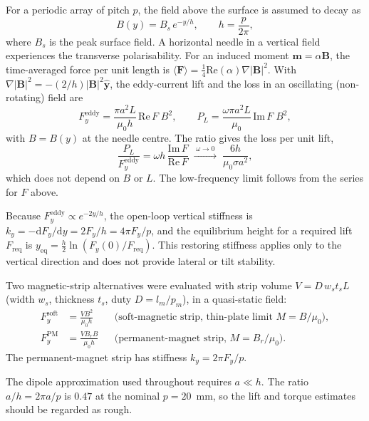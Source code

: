 \documentclass[12pt, a4paper]{article}
\begin{document}
For a periodic array of pitch $p$, the field above the surface is assumed to decay as
\begin{equation}
B(y)=B_s\,e^{-y/h},
\qquad
h=\frac{p}{2\pi},
\end{equation}
where $B_s$ is the peak surface field. A horizontal needle in a vertical field experiences the transverse polarisability. For an induced moment $\mathbf{m}=\alpha\mathbf{B}$, the time-averaged force per unit length is $\langle\mathbf{F}\rangle=\tfrac14\mathrm{Re}(\alpha)\nabla|\mathbf{B}|^{2}$. With $\nabla|\mathbf{B}|^{2}=-(2/h)|\mathbf{B}|^{2}\hat{\mathbf{y}}$, the eddy-current lift and the loss in an oscillating (non-rotating) field are
\begin{equation}
F_y^{\text{eddy}}
=
\frac{\pi a^{2}L}{\mu_0h}\,\mathrm{Re}\,F\;B^{2},
\qquad
P_L
=
\frac{\omega\pi a^{2}L}{\mu_0}\,\mathrm{Im}\,F\;B^{2},
\end{equation}
with $B=B(y)$ at the needle centre. The ratio gives the loss per unit lift,
\begin{equation}
\frac{P_L}{F_y^{\text{eddy}}}
=
\omega h\,\frac{\mathrm{Im}\,F}{\mathrm{Re}\,F}
\;\xrightarrow{\;\omega\to0\;}\;
\frac{6h}{\mu_0\sigma a^{2}},
\end{equation}
which does not depend on $B$ or $L$. The low-frequency limit follows from the series for $F$ above.

Because $F_y^{\text{eddy}}\propto e^{-2y/h}$, the open-loop vertical stiffness is $k_y=-\mathrm{d}F_y/\mathrm{d}y=2F_y/h=4\pi F_y/p$, and the equilibrium height for a required lift $F_{\text{req}}$ is $y_{\text{eq}}=\tfrac{h}{2}\ln\!\left(F_y(0)/F_{\text{req}}\right)$. This restoring stiffness applies only to the vertical direction and does not provide lateral or tilt stability.

Two magnetic-strip alternatives were evaluated with strip volume $V=D\,w_st_sL$ (width $w_s$, thickness $t_s$, duty $D=l_m/p_m$), in a quasi-static field:
\begin{align}
F_y^{\text{soft}}&=\frac{V B^{2}}{\mu_0h}
&&\text{(soft-magnetic strip, thin-plate limit } M=B/\mu_0\text{)},\\
F_y^{\text{PM}}&=\frac{V B_r B}{\mu_0h}
&&\text{(permanent-magnet strip, } M=B_r/\mu_0\text{)}.
\end{align}
The permanent-magnet strip has stiffness $k_y=2\pi F_y/p$.

The dipole approximation used throughout requires $a\ll h$. The ratio $a/h=2\pi a/p$ is $0.47$ at the nominal $p=20$~mm, so the lift and torque estimates should be regarded as rough.
\end{document}
